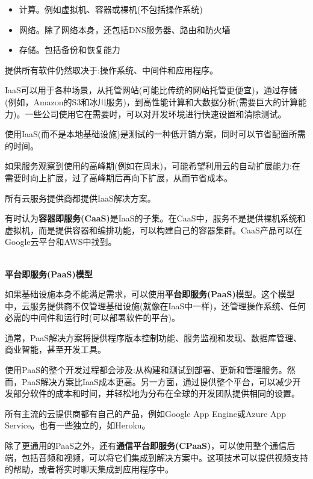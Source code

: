 \begin{itemize}
\item 
计算。例如虚拟机、容器或裸机(不包括操作系统)

\item 
网络。除了网络本身，还包括DNS服务器、路由和防火墙

\item 
存储。包括备份和恢复能力
\end{itemize}

提供所有软件仍然取决于:操作系统、中间件和应用程序。

IaaS可以用于各种场景，从托管网站(可能比传统的网站托管更便宜)，通过存储(例如，Amazon的S3和冰川服务)，到高性能计算和大数据分析(需要巨大的计算能力)。一些公司使用它在需要时，可以对开发环境进行快速设置和清除测试。

使用IaaS(而不是本地基础设施)是测试的一种低开销方案，同时可以节省配置所需的时间。

如果服务观察到使用的高峰期(例如在周末)，可能希望利用云的自动扩展能力:在需要时向上扩展，过了高峰期后再向下扩展，从而节省成本。

所有云服务提供商都提供IaaS解决方案。

有时认为\textbf{容器即服务(CaaS)}是IaaS的子集。在CaaS中，服务不是提供裸机系统和虚拟机，而是提供容器和编排功能，可以构建自己的容器集群。CaaS产品可以在Google云平台和AWS中找到。

\hspace*{\fill} \\ %
\noindent
\textbf{平台即服务(PaaS)模型}

如果基础设施本身不能满足需求，可以使用\textbf{平台即服务(PaaS)}模型。这个模型中，云服务提供商不仅管理基础设施(就像在IaaS中一样)，还管理操作系统、任何必需的中间件和运行时(可以部署软件的平台)。

通常，PaaS解决方案将提供程序版本控制功能、服务监视和发现、数据库管理、商业智能，甚至开发工具。

使用PaaS的整个开发过程都会涉及:从构建和测试到部署、更新和管理服务。然而，PaaS解决方案比IaaS成本更高。另一方面，通过提供整个平台，可以减少开发部分软件的成本和时间，并轻松地为分布在全球的开发团队提供相同的设置。

所有主流的云提供商都有自己的产品，例如Google App Engine或Azure App Service。也有一些独立的，如Heroku。

除了更通用的PaaS之外，还有\textbf{通信平台即服务(CPaaS)}，可以使用整个通信后端，包括音频和视频，可以将它们集成到解决方案中。这项技术可以提供视频支持的帮助，或者将实时聊天集成到应用程序中。

